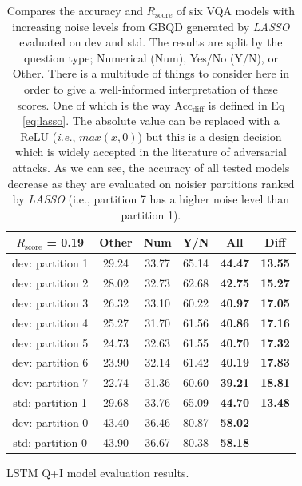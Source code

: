 \documentclass[letterpaper]{article}
\newcommand{\ie}{}\def\ie/{{\em i.e.}}
\newcommand{\lasso}{}\def\lasso/{\textit{LASSO}}
\newcommand{\rscore}{}\def\rscore/{$R_{\text{score}}$}
\begin{document}
\begin{table}
\begin{subtable}{0.49\linewidth}
		\begin{tabular}{c | c c c c | c}
			\rscore/ = 0.19  & Other & Num   & Y/N   & All            & Diff           \\ [0.5ex]
			\hline
			dev: partition 1 & 29.24 & 33.77 & 65.14 & \textbf{44.47} & \textbf{13.55} \\
			dev: partition 2 & 28.02 & 32.73 & 62.68 & \textbf{42.75} & \textbf{15.27} \\
			dev: partition 3 & 26.32 & 33.10 & 60.22 & \textbf{40.97} & \textbf{17.05} \\
			dev: partition 4 & 25.27 & 31.70 & 61.56 & \textbf{40.86} & \textbf{17.16} \\
			dev: partition 5 & 24.73 & 32.63 & 61.55 & \textbf{40.70} & \textbf{17.32} \\
			dev: partition 6 & 23.90 & 32.14 & 61.42 & \textbf{40.19} & \textbf{17.83} \\
			dev: partition 7 & 22.74 & 31.36 & 60.60 & \textbf{39.21} & \textbf{18.81} \\
			\hline
			std: partition 1 & 29.68 & 33.76 & 65.09 & \textbf{44.70} & \textbf{13.48} \\
			\hline
			dev: partition 0 & 43.40 & 36.46 & 80.87 & \textbf{58.02} & -              \\
			std: partition 0 & 43.90 & 36.67 & 80.38 & \textbf{58.18} & -              \\
			\hline
		\end{tabular}
		\caption{LSTM Q+I model evaluation results.}
	\end{subtable}
	\caption{Compares the accuracy and \rscore/ of six VQA models with increasing noise levels from GBQD generated by \lasso/ evaluated on dev and std. The results are split by the question type; Numerical (Num), Yes/No (Y/N), or Other. There is a multitude of things to consider here in order to give a well-informed interpretation of these scores. One of which is the way $\text{Acc}_\text{diff}$ is defined in Eq \ref{eq:lasso}. The absolute value can be replaced with a ReLU (\ie/, $max(x, 0)$) but this is a design decision which is widely accepted in the literature of adversarial attacks. As we can see, the accuracy of all tested models decrease as they are evaluated on noisier partitions ranked by \lasso/ (i.e., partition 7 has a higher noise level than partition 1).}
	\label{tbl:lasso_gbqd}
\end{table}
\end{document}
